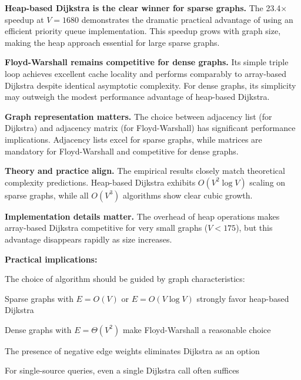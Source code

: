 \documentclass[12pt, a4paper]{report}
\begin{document}
\begin{dashenum}
  \item \textbf{Heap-based Dijkstra is the clear winner for sparse graphs.} The 23.4$\times$ speedup at $V = 1680$ demonstrates the dramatic practical advantage of using an efficient priority queue implementation. This speedup grows with graph size, making the heap approach essential for large sparse graphs.
  
  \item \textbf{Floyd-Warshall remains competitive for dense graphs.} Its simple triple loop achieves excellent cache locality and performs comparably to array-based Dijkstra despite identical asymptotic complexity. For dense graphs, its simplicity may outweigh the modest performance advantage of heap-based Dijkstra.
  
  \item \textbf{Graph representation matters.} The choice between adjacency list (for Dijkstra) and adjacency matrix (for Floyd-Warshall) has significant performance implications. Adjacency lists excel for sparse graphs, while matrices are mandatory for Floyd-Warshall and competitive for dense graphs.
  
  \item \textbf{Theory and practice align.} The empirical results closely match theoretical complexity predictions. Heap-based Dijkstra exhibits $O(V^2 \log V)$ scaling on sparse graphs, while all $O(V^3)$ algorithms show clear cubic growth.
  
  \item \textbf{Implementation details matter.} The overhead of heap operations makes array-based Dijkstra competitive for very small graphs ($V < 175$), but this advantage disappears rapidly as size increases.
\end{dashenum}

\textbf{Practical implications:}

The choice of algorithm should be guided by graph characteristics:
\begin{dashenum}
  \item Sparse graphs with $E = O(V)$ or $E = O(V \log V)$ strongly favor heap-based Dijkstra
  \item Dense graphs with $E = \Theta(V^2)$ make Floyd-Warshall a reasonable choice
  \item The presence of negative edge weights eliminates Dijkstra as an option
  \item For single-source queries, even a single Dijkstra call often suffices
\end{dashenum}
\end{document}
